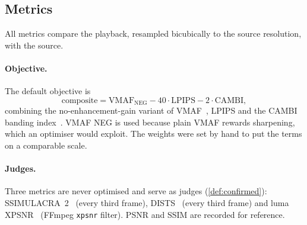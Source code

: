 \subsection{Metrics}
\label{sec:metrics}

All metrics compare the playback, resampled bicubically to the source resolution, with the source.

\paragraph{Objective.}
The default objective is
\begin{equation}
  \text{composite} = \text{VMAF}_{\text{NEG}} - 40\cdot\text{LPIPS} - 2\cdot\text{CAMBI},
\end{equation}
combining the no-enhancement-gain variant of VMAF~\cite{li2016toward}, LPIPS and the CAMBI banding
index~\cite{tandon2021cambi}. VMAF NEG is used because plain VMAF rewards sharpening, which an
optimiser would exploit. The weights were set by hand to put the terms on a comparable scale.

\paragraph{Judges.}
Three metrics are never optimised and serve as judges (\cref{def:confirmed}):
SSIMULACRA~2~\cite{sneyers2022ssimulacra2} (every third frame), DISTS~\cite{ding2022image} (every
third frame) and luma XPSNR~\cite{helmrich2020xpsnr} (FFmpeg \texttt{xpsnr} filter). PSNR and SSIM
are recorded for reference.
